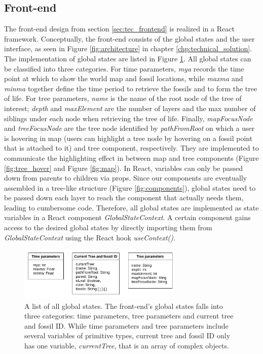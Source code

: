\documentclass[11pt, a4paper,oneside,chapterprefix=false]{scrbook}
\begin{document}
\subsection{Front-end} \label{subsec: implementation_frontend}
The front-end design from section \ref{sec:tec_frontend} is realized in a React framework. Conceptually, the front-end consists of the global states and the user interface, as seen in Figure \ref{fig:architecture} in chapter \ref{chp:technical_solution}. The implementation of global states are listed in Figure \ref{fig:global_state}. All global states can be classified into three categories. For time parameters, \emph{mya} records the time point at which to show the world map and fossil locations, while \emph{maxma} and \emph{minma} together define the time period to retrieve the fossils and to form the tree of life. For tree parameters, \emph{name} is the name of the root node of the tree of interest; \emph{depth} and \emph{maxElement} are the number of layers and the max number of siblings under each node when retrieving the tree of life. Finally, \emph{mapFocusNode} and \emph{treeFocusNode} are the tree node identified by \emph{pathFromRoot} on which a user is hovering in map (users can highlight a tree node by hovering on a fossil point that is attached to it) and tree component, respectively. They are implemented to communicate the highlighting effect in between map and tree components (Figure \ref{fig:tree_hover} and Figure \ref{fig:map}). In React, variables can only be passed down from parents to children via props. Since our components are eventually assembled in a tree-like structure (Figure \ref{fig:components}), global states need to be passed down each layer to reach the component that actually needs them, leading to cumbersome code. Therefore, all global states are implemented as state variables in a React component \emph{GlobalStateContext}. A certain component gains access to the desired global states by directly importing them from \emph{GlobalStateContext} using the React hook \emph{useContext()}. \\

\begin{figure}[h]
	\centering
	\includegraphics[width=0.7\textwidth]{figures/implementation/global_state}
	\caption{A list of all global states. The front-end's global states falls into three categories: time parameters, tree parameters and current tree and fossil ID. While time parameters and tree parameters include several variables of primitive types, current tree and fossil ID only has one variable, \emph{currentTree}, that is an array of complex objects.}
	\label{fig:global_state}
\end{figure}
\end{document}
